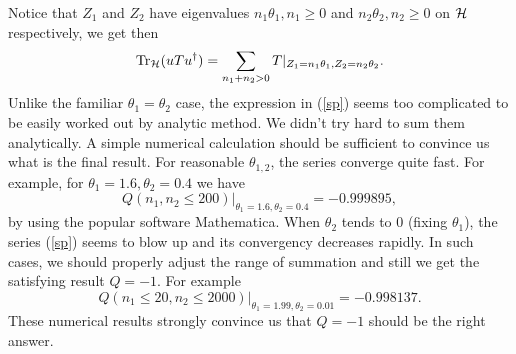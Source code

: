 \documentclass[a4paper,a4paper]{article}
\begin{document}
Notice that $Z_1$ and $Z_2$ have eigenvalues $n_1\theta_1,n_1 \geq
0$ and $n_2\theta_2,n_2\geq 0$ on ${\cal H}$ respectively, we get
then
\begin{equation}
\label{sp}
{\rm Tr}_{\cal H}(uTu^\dag)=\sum_{n_1+n_2>0}T|_{Z_1=n_1\theta_1,
Z_2=n_2\theta_2}.
\end{equation}
Unlike the familiar $\theta_1=\theta_2$ case, the expression in
(\ref{sp}) seems too complicated to be easily worked out by
analytic method. We didn't try hard to sum them analytically. A
simple numerical calculation should be sufficient to convince us
what is the final result.  For reasonable $\theta_{1,2}$, the
series converge quite fast. For example, for
$\theta_1=1.6,\theta_2=0.4$ we have
\begin{equation}
Q(n_1,n_2\leq 200)|_{\theta_1=1.6,\theta_2=0.4}=-0.999895,
\end{equation}
by using the popular software Mathematica. When $\theta_2$ tends
to 0 (fixing $\theta_1$), the series (\ref{sp}) seems to blow up
and its convergency decreases rapidly. In such cases, we should
properly adjust the range of summation and still we get the
satisfying result $Q=-1$. For example
\begin{equation}
Q(n_1\leq 20,n_2\leq 2000)|_{\theta_1=1.99,\theta_2=0.01}=-0.998137.
\end{equation}
These numerical results strongly convince us that $Q=-1$ should be the
right answer.
\end{document}

